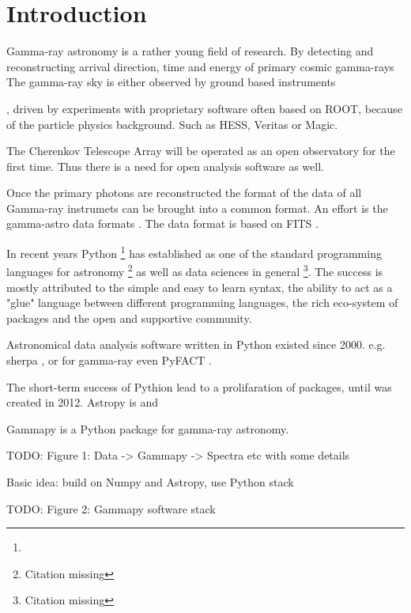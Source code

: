 \section{Introduction}
\label{sec:intro}


Gamma-ray astronomy is a rather young field of research.
By detecting and reconstructing arrival direction, time and energy
of primary cosmic gamma-rays
The gamma-ray sky is either observed by ground based instruments

, driven by experiments with proprietary software often based
on ROOT, because of the particle physics background. Such 
as HESS, Veritas or Magic.

The Cherenkov Telescope Array will be operated as an open
observatory for the first time. Thus there is a need for
open analysis software as well.

Once the primary photons are reconstructed the format of the data
of all Gamma-ray instrumets can be brought into a common format.
An effort is the gamma-astro data formats \cite{gadf-zenodo}.
The data format is based on FITS  \citep{fits}.


In recent years Python \footnote{\PythonUrl} has established as one of the
standard programming  languages for astronomy \footnote{Citation missing}
as well as data sciences in  general \footnote{Citation missing}.
The success is mostly attributed to the simple and easy to learn syntax,
the ability to act as a "glue" language between different programming
languages, the rich eco-system of packages and the open and supportive
community.

Astronomical data analysis software written in Python existed since 2000.
e.g. sherpa \citep{sherpa-2011, sherpa-2009}, or for gamma-ray even
PyFACT \citep{pyfact}.

The short-term success of Pythion lead to a prolifaration of packages, until
\astropy \citep{astropy} was created in 2012. Astropy is and


Gammapy is a Python package for gamma-ray astronomy.



TODO: Figure 1: Data -> Gammapy -> Spectra etc with some details 

Basic idea: build on Numpy and Astropy, use Python stack

TODO: Figure 2: Gammapy software stack

